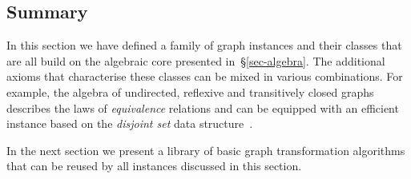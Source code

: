 \subsection{Summary}

In this section we have defined a family of graph instances and their classes that are all
build on the algebraic core presented in~\S\ref{sec-algebra}. The additional axioms
that characterise these classes
can be mixed in various combinations. For example, the algebra of undirected, reflexive
and transitively closed graphs describes the laws of \emph{equivalence} relations and can be
equipped with an
efficient instance based on the \emph{disjoint set} data structure~\cite{1984_set_union_tarjan}.

In the next section we present a library of basic graph transformation algorithms that
can be reused by all instances discussed in this section.
